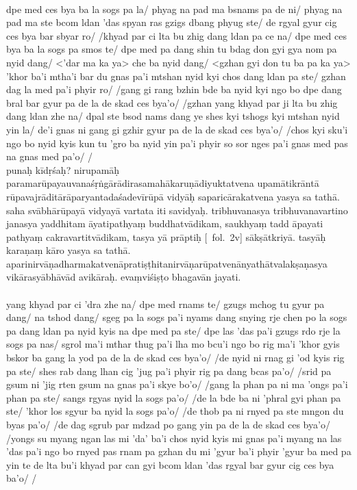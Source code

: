 \documentclass[12pt]{article}
\begin{document}
\textbf{\TVB}\\
dpe med ces bya ba la sogs pa la/ phyag na pad ma bsnams pa de ni/ phyag na pad ma ste bcom ldan 'das spyan ras gzigs dbang phyug ste/ de rgyal gyur cig ces bya bar sbyar ro/ /khyad par ci lta bu zhig dang ldan pa ce na/ dpe med ces bya ba la sogs pa smos te/ dpe med pa dang shin tu bdag don gyi gya nom pa nyid dang/ <'dar ma ka ya> che ba nyid dang/ <gzhan gyi don tu ba pa ka ya> 'khor ba'i mtha'i bar du gnas pa'i mtshan nyid kyi chos dang ldan pa ste/ gzhan dag la med pa'i phyir ro/ /gang gi rang bzhin bde ba nyid kyi ngo bo dpe dang bral bar gyur pa de la de skad ces bya'o/ /gzhan yang khyad par ji lta bu zhig dang ldan zhe na/ dpal ste bsod nams dang ye shes kyi tshogs kyi mtshan nyid yin la/ de'i gnas ni gang gi gzhir gyur pa de la de skad ces bya'o/ /chos kyi sku'i ngo bo nyid kyis kun tu 'gro ba nyid yin pa'i phyir so sor nges pa'i gnas med pas na gnas med pa'o/ /\\

punaḥ kīdṛśaḥ?
nirupamāḥ paramarūpayauvanaśṛṅgārādirasamahākaruṇādiyuktatvena upamātikrāntā rūpavajrāditārāparyantadaśadevīrūpā vidyāḥ saparicārakatvena yasya sa tathā.
saha svābhārūpayā vidyayā vartata iti savidyaḥ.
tribhuvanasya tribhuvanavartino janasya yaddhitam āyatipathyaṃ\footnoteB{
	āyatipathyaṃ] \emph{variant word division in} \EDD: āyati pathyaṃ
} buddhatvādikam, saukhyaṃ tadd āpayati pathyaṃ\footnoteB{
	āpātapathyaṃ] conj.\ (Tib: 'phral gyi phan pa); āpayati pathyaṃ \EDD
} cakravartitvādikam, tasya yā prāptiḥ [\MS\ fol.\ 2v] sākṣātkriyā.
tasyāḥ karaṇaṃ kāro yasya sa tathā.
aparinirvāṇadharmakatvenāpratiṣṭhitanirvāṇarūpatvenānyathātvalakṣaṇasya vikārasyābhāvād avikāraḥ.
evaṃviśiṣṭo bhagavān jayati.\\

\textbf{\TVA}\\
yang khyad par ci 'dra zhe na/ dpe med rnams te/ gzugs mchog tu gyur pa dang/ na tshod dang/ sgeg pa la sogs pa'i nyams dang snying rje chen po la sogs pa dang ldan pa nyid kyis na dpe med pa ste/ dpe las 'das pa'i gzugs rdo rje la sogs pa nas/ sgrol ma'i mthar thug pa'i lha mo bcu'i ngo bo rig ma'i 'khor gyis bskor ba gang la yod pa de la de skad ces bya'o/ /de nyid ni rnag gi 'od kyis rig pa ste/ shes rab dang lhan cig 'jug pa'i phyir rig pa dang bcas pa'o/ /srid pa gsum ni 'jig rten gsum na gnas pa'i skye bo'o/ /gang la phan pa ni ma 'ongs pa'i phan pa ste/ sangs rgyas nyid la sogs pa'o/ /de la bde ba ni 'phral gyi phan pa ste/ 'khor los sgyur ba nyid la sogs pa'o/ /de thob pa ni rnyed pa ste mngon du byas pa'o/ /de dag sgrub par mdzad po gang yin pa de la de skad ces bya'o/ /yongs su myang ngan las mi 'da' ba'i chos nyid kyis mi gnas pa'i myang na las 'das pa'i ngo bo rnyed pas rnam pa gzhan du mi 'gyur ba'i phyir 'gyur ba med pa yin te de lta bu'i khyad par can gyi bcom ldan 'das rgyal bar gyur cig ces bya ba'o/ /\\
\end{document}
